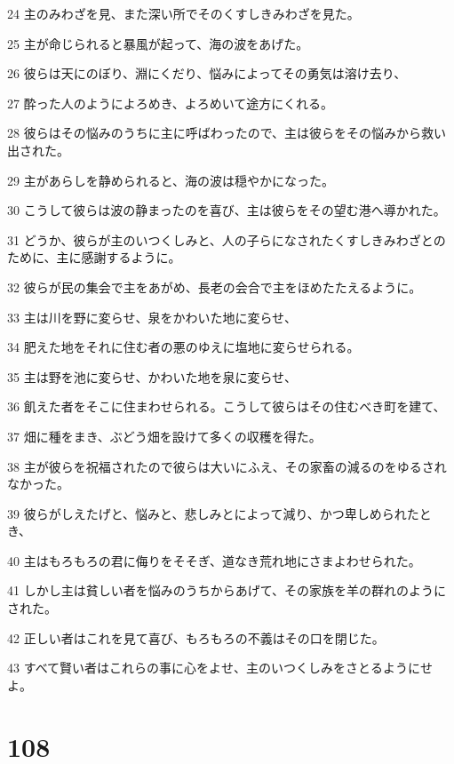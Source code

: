 \par 24 主のみわざを見、また深い所でそのくすしきみわざを見た。
\par 25 主が命じられると暴風が起って、海の波をあげた。
\par 26 彼らは天にのぼり、淵にくだり、悩みによってその勇気は溶け去り、
\par 27 酔った人のようによろめき、よろめいて途方にくれる。
\par 28 彼らはその悩みのうちに主に呼ばわったので、主は彼らをその悩みから救い出された。
\par 29 主があらしを静められると、海の波は穏やかになった。
\par 30 こうして彼らは波の静まったのを喜び、主は彼らをその望む港へ導かれた。
\par 31 どうか、彼らが主のいつくしみと、人の子らになされたくすしきみわざとのために、主に感謝するように。
\par 32 彼らが民の集会で主をあがめ、長老の会合で主をほめたたえるように。
\par 33 主は川を野に変らせ、泉をかわいた地に変らせ、
\par 34 肥えた地をそれに住む者の悪のゆえに塩地に変らせられる。
\par 35 主は野を池に変らせ、かわいた地を泉に変らせ、
\par 36 飢えた者をそこに住まわせられる。こうして彼らはその住むべき町を建て、
\par 37 畑に種をまき、ぶどう畑を設けて多くの収穫を得た。
\par 38 主が彼らを祝福されたので彼らは大いにふえ、その家畜の減るのをゆるされなかった。
\par 39 彼らがしえたげと、悩みと、悲しみとによって減り、かつ卑しめられたとき、
\par 40 主はもろもろの君に侮りをそそぎ、道なき荒れ地にさまよわせられた。
\par 41 しかし主は貧しい者を悩みのうちからあげて、その家族を羊の群れのようにされた。
\par 42 正しい者はこれを見て喜び、もろもろの不義はその口を閉じた。
\par 43 すべて賢い者はこれらの事に心をよせ、主のいつくしみをさとるようにせよ。

\chapter{108}

